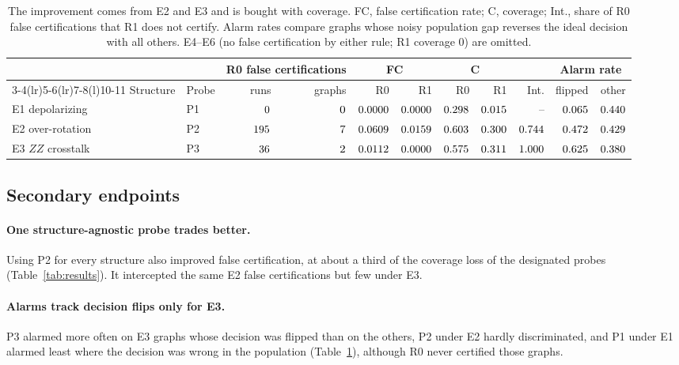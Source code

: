 \documentclass[10pt,twocolumn]{article}
\begin{document}
\begin{table}[t]
\centering
\caption{The improvement comes from E2 and E3 and is bought with coverage. FC,
false certification rate; C, coverage; Int., share of R0 false certifications
that R1 does not certify. Alarm rates compare graphs whose noisy population gap
reverses the ideal decision with all others. E4--E6 (no false certification by
either rule; R1 coverage 0) are omitted.}
\label{tab:primary}
\small
\begin{tabular}{@{}llrrrrrrrrr@{}}
\toprule
 & & \multicolumn{2}{c}{R0 false certifications} & \multicolumn{2}{c}{FC} & \multicolumn{2}{c}{C} & & \multicolumn{2}{c}{Alarm rate} \\
\cmidrule(lr){3-4}\cmidrule(lr){5-6}\cmidrule(lr){7-8}\cmidrule(l){10-11}
Structure & Probe & runs & graphs & R0 & R1 & R0 & R1 & Int. & flipped & other \\
\midrule
E1 depolarizing & P1 & $0$ & $0$ & $0.0000$ & $0.0000$ & $0.298$ & $0.015$ & -- & $0.065$ & $0.440$ \\
E2 over-rotation & P2 & $195$ & $7$ & $0.0609$ & $0.0159$ & $0.603$ & $0.300$ & $0.744$ & $0.472$ & $0.429$ \\
E3 $ZZ$ crosstalk & P3 & $36$ & $2$ & $0.0112$ & $0.0000$ & $0.575$ & $0.311$ & $1.000$ & $0.625$ & $0.380$ \\
\bottomrule
\end{tabular}
\end{table}

\subsection{Secondary endpoints}

\paragraph{One structure-agnostic probe trades better.} Using P2 for every
structure also improved false certification, at about a third of the coverage
loss of the designated probes (Table~\ref{tab:results}). It intercepted the
same E2 false certifications but few under E3.

\paragraph{Alarms track decision flips only for E3.} P3 alarmed more often on
E3 graphs whose decision was flipped than on the others, P2 under E2 hardly
discriminated, and P1 under E1 alarmed least where the decision was wrong in
the population (Table~\ref{tab:primary}), although R0 never certified those
graphs.
\end{document}
